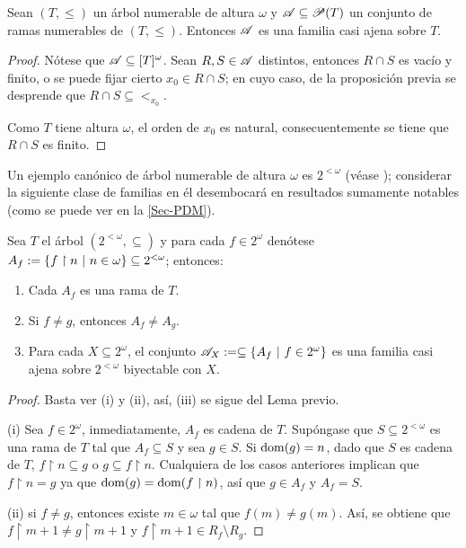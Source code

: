  \begin{proposicion}
  Sean $(T,\leq)$ un árbol numerable de altura $\omega$ y $\mathscr{A} \subseteq \mathscr{P}(T)$ un conjunto de ramas numerables de $(T,\leq)$. Entonces $\mathscr{A}$ es una familia casi ajena sobre $T$.
 \end{proposicion}

 \begin{proof}
  Nótese que $\mathscr{A} \subseteq [T]^\omega$. Sean $R,S \in \mathscr{A}$ distintos, entonces $R \cap S$ es vacío y finito, o se puede fijar cierto $x_0 \in R \cap S$; en cuyo caso, de la proposición previa se desprende que $R \cap S \subseteq <_{x_0}$.

  Como $T$ tiene altura $\omega$, el orden de $x_0$ es natural, consecuentemente se tiene que $R \cap S$ es finito.
 \end{proof}

 Un ejemplo canónico de árbol numerable de altura $\omega$ es $2^{<\omega}$ (véase \pageref{arbol-2Ramas}); considerar la siguiente clase de familias en él desembocará en resultados sumamente notables (como se puede ver en la \autoref{Sec-PDM}).

 \begin{proposicion}
  Sea $T$ el árbol $(2^{<\omega},\subseteq)$ y para cada $f \in 2^\omega$ denótese $A_f:=\{ f \upharpoonright n \text{ $|$ } n \in \omega \} \subseteq 2^{<\omega}$; entonces:
  \begin{enumerate}
   \item Cada $A_f$ es una rama de $T$.
   \item Si $f\neq g$, entonces $A_f \neq A_g$.
   \item Para cada $X \subseteq 2^\omega$, el conjunto $\mathscr{A}_X := \subseteq \{A_f \text{ $|$ } f \in 2^\omega\}$ es una familia casi ajena sobre $2^{<\omega}$ biyectable con $X$.
  \end{enumerate}
 \end{proposicion}
 \begin{proof}
  Basta ver (i) y (ii), así, (iii) se sigue del Lema previo.

  (i) Sea $f \in 2^\omega$, inmediatamente, $A_f$ es cadena de $T$. Supóngase que $S \subseteq 2^{<\omega}$ es una rama de $T$ tal que $A_f \subseteq S$ y sea $g \in S$. Si $\operatorname{dom}(g)=n$, dado que $S$ es cadena de $T$, $f \upharpoonright n \subseteq g$ o $g \subseteq f \upharpoonright n$. Cualquiera de los casos anteriores implican que $f \upharpoonright n = g$ ya que $\operatorname{dom}(g)=\operatorname{dom}(f \upharpoonright n)$, así que $g \in A_f$ y $A_f = S$.

  (ii) si $f \neq g$, entonces existe $m\in \omega$ tal que $f(m) \neq g(m)$. Así, se obtiene que $f \upharpoonright m+1 \neq g \upharpoonright m+1$ y $f \upharpoonright m+1 \in R_f \setminus R_g$.
 \end{proof}

